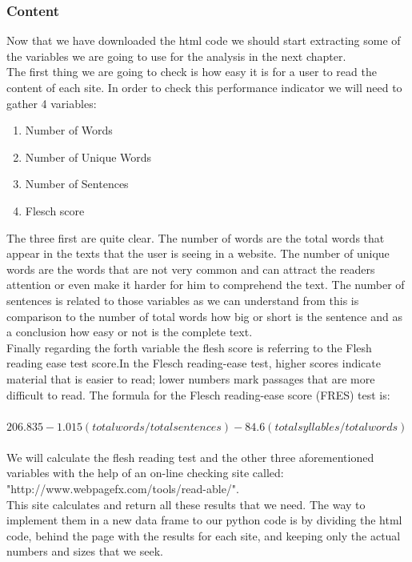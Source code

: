 \documentclass{article}
\begin{document}
\subsubsection{Content}\label{content}
Now that we have downloaded the html code we should start extracting some of the variables we are going to use for the analysis in the next chapter.\\
The first thing we are going to check is how easy it is for a user to read the content of each site. In order to check this performance indicator we will need to gather 4 variables:
\begin{enumerate}
\item Number of Words
\item Number of Unique Words
\item Number of Sentences
\item Flesch score
\end{enumerate}
The three first are quite clear. The number of words are the total words that appear in the texts that the user is seeing in a website. The number of unique words are the words that are not very common and can attract the readers attention or even make it harder for him to comprehend the text. The number of sentences is related to those variables as we can understand from this is comparison to the number of total words how big or short is the sentence and as a conclusion how easy or not is the complete text.\\
Finally regarding the forth variable the flesh score is referring to the Flesh reading ease test score.In the Flesch reading-ease test, higher scores indicate material that is easier to read; lower numbers mark passages that are more difficult to read. The formula for the Flesch reading-ease score (FRES) test is:\\ \\
$206.835 - 1.015 (total words/total sentences) - 84.6 (total syllables/total words)$\\
\\
We will calculate the flesh reading test and the other three aforementioned variables with the help of an on-line checking site called: \\
"http://www.webpagefx.com/tools/read-able/".\\
This site calculates and return all these results that we need. The way to implement them in a new data frame to our python code is by dividing the html code, behind the page with the results for each site, and keeping only the actual numbers and sizes that we seek. \\
\end{document}
